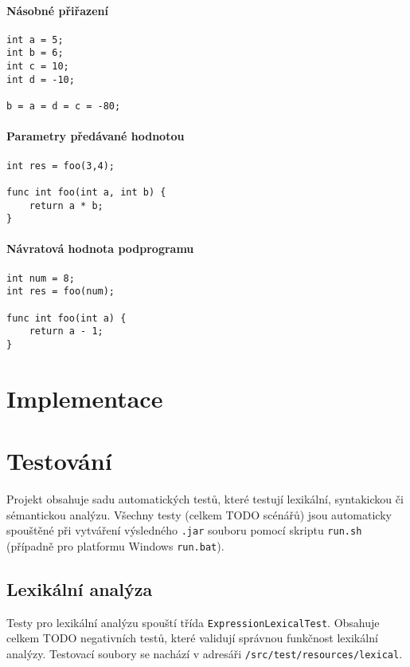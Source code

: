 \documentclass[czech, oth, kiv, he, iso690numb, viewonly]{fasthesis}
\begin{document}
\subsubsection{Násobné přiřazení}
\begin{lstlisting}[]
int a = 5;
int b = 6;
int c = 10;
int d = -10;

b = a = d = c = -80;
\end{lstlisting}

\subsubsection{Parametry předávané hodnotou}
\begin{lstlisting}[]  
int res = foo(3,4);
    
func int foo(int a, int b) {
    return a * b;
}
\end{lstlisting}

\subsubsection{Návratová hodnota podprogramu}
\begin{lstlisting}[]
int num = 8;    
int res = foo(num);

func int foo(int a) {
    return a - 1;
}
\end{lstlisting}

\chapter{Implementace}

\chapter{Testování}
Projekt obsahuje sadu automatických testů, které testují lexikální, syntakickou či sémantickou analýzu.
Všechny testy (celkem TODO scénářů) jsou automaticky spouštěné při vytváření výsledného
\texttt{.jar} souboru pomocí skriptu \texttt{run.sh} (případně pro platformu Windows \texttt{run.bat}).

\section{Lexikální analýza}
Testy pro lexikální analýzu spouští třída \texttt{ExpressionLexicalTest}. Obsahuje celkem TODO negativních testů, které validují správnou funkčnost
lexikální analýzy. Testovací soubory se nachází v adresáři \texttt{/src/test/resources/lexical}.
\end{document}
